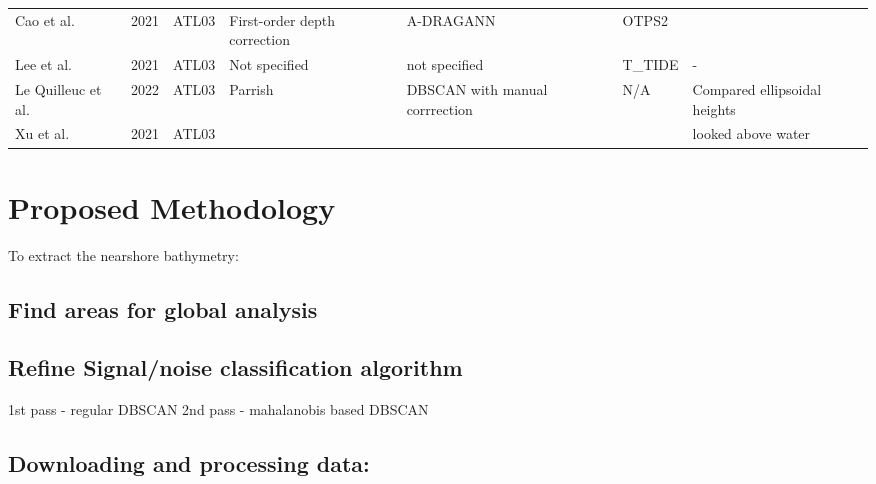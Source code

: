 \begin{landscape}
\begin{table}
\begin{tabular}{lllp{3cm}p{3cm}ll}
                  Cao et al. \cite{Cao2021}                            & 2021 & ATL03   & First-order depth correction  & A-DRAGANN                      & OTPS2           &                              \\
                  Lee et al.  \cite{Lee2021}                           & 2021 & ATL03   & Not specified                 & not specified                  & T\_TIDE         & -                            \\
                  Le Quilleuc et al. \cite{LeQuilleuc2022b}            & 2022 & ATL03   & Parrish                       & DBSCAN with manual corrrection & N/A             & Compared ellipsoidal heights \\
                  Xu et al.  \cite{Xu2022a}                            & 2021 & ATL03   &                               &                                &                 & looked above water           \\
                  \bottomrule
            \end{tabular}
      \end{table}
\end{landscape}

\chapter{Proposed Methodology}

To extract the nearshore bathymetry:

\section{Find areas for global analysis}

\section{Refine Signal/noise classification algorithm}

1st pass - regular DBSCAN
2nd pass - mahalanobis based DBSCAN
\section{Downloading and processing  data:}

